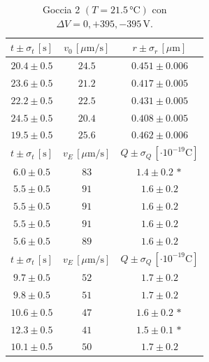 \documentclass[]{article}
\begin{document}
    \begin{table}[H]
        \centering
        \begin{tabular}{||c|c|c||}
            \hline
            $t \pm \sigma_t \, \left[\text{s}\right]$ & $v_0 \, \left[\mu\text{m/s}\right]$ & $r \pm \sigma_r \, \left[\mu\text{m}\right]$ \\\hline
            \hline
            $20.4 \pm 0.5$ & $24.5$ & $0.451 \pm 0.006$ \\\hline
            $23.6 \pm 0.5$ & $21.2$ & $0.417 \pm 0.005$ \\\hline
            $22.2 \pm 0.5$ & $22.5$ & $0.431 \pm 0.005$ \\\hline
            $24.5 \pm 0.5$ & $20.4$ & $0.408 \pm 0.005$ \\\hline
            $19.5 \pm 0.5$ & $25.6$ & $0.462 \pm 0.006$ \\\hline
            \hline
            $t \pm \sigma_t \, \left[\text{s}\right]$ & $v_E \, \left[\mu\text{m/s}\right]$ & $Q \pm \sigma_Q \, \left[\cdot 10^{-19} \text{C}\right]$ \\\hline
            \hline
            $6.0 \pm 0.5$ & $83$ & $1.4 \pm 0.2\,\ast$ \\\hline
            $5.5 \pm 0.5$ & $91$ & $1.6 \pm 0.2$ \\\hline
            $5.5 \pm 0.5$ & $91$ & $1.6 \pm 0.2$ \\\hline
            $5.5 \pm 0.5$ & $91$ & $1.6 \pm 0.2$ \\\hline
            $5.6 \pm 0.5$ & $89$ & $1.6 \pm 0.2$ \\\hline
            \hline
            $t \pm \sigma_t \, \left[\text{s}\right]$ & $v_E \, \left[\mu\text{m/s}\right]$ & $Q \pm \sigma_Q \, \left[\cdot 10^{-19} \text{C}\right]$ \\\hline
            \hline
            $ 9.7 \pm 0.5$ & $52$ & $1.7 \pm 0.2$ \\\hline
            $ 9.8 \pm 0.5$ & $51$ & $1.7 \pm 0.2$ \\\hline
            $10.6 \pm 0.5$ & $47$ & $1.6 \pm 0.2\,\ast$ \\\hline
            $12.3 \pm 0.5$ & $41$ & $1.5 \pm 0.1\,\ast$ \\\hline
            $10.1 \pm 0.5$ & $50$ & $1.7 \pm 0.2$ \\\hline
        \end{tabular}
        \caption{Goccia 2 $\left(T = 21.5\, \text{°C}\right)$ con $\Delta V = 0,+395,-395 \,\text{V}$.}
        \label{goccia-2}
    \end{table}
\end{document}
